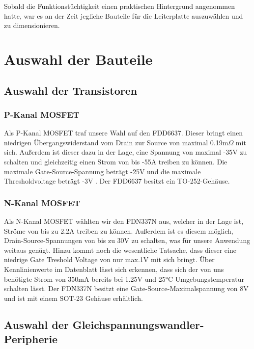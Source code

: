 Sobald die Funktionstüchtigkeit einen praktischen Hintergrund angenommen hatte,
war es an der Zeit jegliche Bauteile für die Leiterplatte auszuwählen und zu dimensionieren.


\newpage
\section{Auswahl der Bauteile}

\subsection{Auswahl der Transistoren}
\subsubsection{P-Kanal MOSFET}

Als P-Kanal MOSFET traf unsere Wahl auf den FDD6637.
Dieser bringt einen niedrigen Übergangswiderstand vom Drain zur Source  von maximal 0.19m$\Omega$ mit sich.
Außerdem ist dieser dazu in der Lage, eine Spannung von maximal -35V zu schalten und gleichzeitig einen Strom von bis -55A treiben zu können.
Die maximale Gate-Source-Spannung beträgt -25V und die maximale Thresholdvoltage beträgt -3V .
Der FDD6637 besitzt ein TO-252-Gehäuse.

\subsubsection{N-Kanal MOSFET}

Als N-Kanal MOSFET wählten wir den FDN337N aus, welcher in der Lage ist, Ströme von bis zu 2.2A treiben zu können.
Außerdem ist es diesem möglich, Drain-Source-Spannungen von bis zu 30V zu schalten, was für unsere Anwendung weitaus genügt.
Hinzu kommt noch die wesentliche Tatsache, dass dieser eine niedrige Gate Treshold Voltage von nur max.1V mit sich bringt.
Über Kennlinienwerte im Datenblatt lässt sich erkennen, dass sich der von uns benötigte Strom von 350mA bereits bei 1.25V und 25°C Umgebungstemperatur schalten lässt.
Der FDN337N besitzt eine Gate-Source-Maximalspannung von 8V und ist mit einem SOT-23 Gehäuse erhältlich.

\subsection{Auswahl der Gleichspannungswandler-Peripherie}

